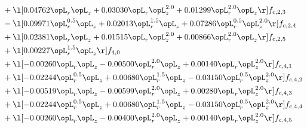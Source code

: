\begin{alignat}{2}
& + \l[  0.04762 \opL_r \opL_z +  0.03030 \opL_r \opL_z^{2.0} +  0.01299 \opL_r^{2.0} \opL_z  \r] f_{c,2,3} \nonumber \\ 
& - \l[  0.09971 \opL_r^{0.5} \opL_z +  0.02013 \opL_r^{1.5} \opL_z +  0.07286 \opL_r^{0.5} \opL_z^{2.0}  \r] f_{c,2,4} \nonumber \\ 
& + \l[  0.02381 \opL_r \opL_z +  0.01515 \opL_r \opL_z^{2.0} +  0.00866 \opL_r^{2.0} \opL_z  \r] f_{c,2,5} \nonumber \\ 
& + \l[  0.00227 \opL_r^{1.5} \opL_z  \r] f_{4,0} \nonumber \\ 
& + \l[  -0.00260 \opL_r \opL_z   -0.00500 \opL_r^{2.0} \opL_z +  0.00140 \opL_r \opL_z^{2.0}  \r] f_{c,4,1} \nonumber \\ 
& + \l[  -0.02244 \opL_r^{0.5} \opL_z +  0.00680 \opL_r^{1.5} \opL_z   -0.03150 \opL_r^{0.5} \opL_z^{2.0}  \r] f_{c,4,2} \nonumber \\ 
& + \l[  -0.00519 \opL_r \opL_z   -0.00599 \opL_r^{2.0} \opL_z +  0.00280 \opL_r \opL_z^{2.0}  \r] f_{c,4,3} \nonumber \\ 
& + \l[  -0.02244 \opL_r^{0.5} \opL_z +  0.00680 \opL_r^{1.5} \opL_z   -0.03150 \opL_r^{0.5} \opL_z^{2.0}  \r] f_{c,4,4} \nonumber \\ 
& + \l[  -0.00260 \opL_r \opL_z   -0.00400 \opL_r^{2.0} \opL_z +  0.00140 \opL_r \opL_z^{2.0}  \r] f_{c,4,5} \nonumber \\ 
\end{alignat} 


